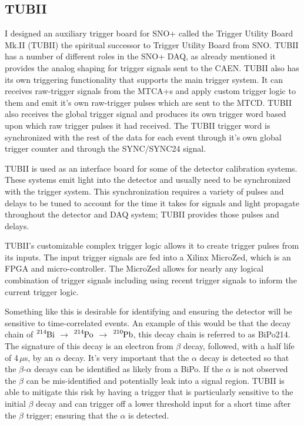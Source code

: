 \subsection{TUBII}
\label{sec:tubii}
I designed an auxiliary trigger board for SNO+ called the Trigger
Utility Board Mk.II (TUBII) the spiritual successor to Trigger Utility Board
from SNO\@. 
TUBII has a number of different roles in the SNO+ DAQ, as already mentioned it
provides the analog shaping for trigger signals sent to the CAEN\@.
TUBII also has its own triggering functionality that supports the main
trigger system. It can receives raw-trigger signals from the MTCA+s and
apply custom trigger logic to them and emit it's own raw-trigger pulses which are
sent to the MTCD\@.
TUBII also receives the global trigger signal and produces its own trigger
word based upon which raw trigger pulses it had received. The TUBII trigger
word is synchronized with the rest of the data for each event through it's own
global trigger counter and through the SYNC/SYNC24 signal.

TUBII is used as an interface board for some of the detector calibration systems.
These systems emit light into the detector and usually need to be
synchronized with the trigger system. This synchronization requires
a variety of pulses and delays to be tuned to account for the time it
takes for signals and light propagate throughout the detector and DAQ
system; TUBII provides those pulses and delays.

TUBII's customizable complex trigger logic
allows it to create trigger pulses from its inputs.
The input trigger signals are fed into a Xilinx MicroZed, which is an FPGA and
micro-controller.
The MicroZed allows for nearly any logical combination of trigger signals including
using recent trigger signals to inform the current trigger logic.

Something like this is desirable for identifying and ensuring the detector will
be sensitive to time-correlated events. An example of this would be that
the decay chain of $\ce{^{214}Bi}$ $\rightarrow$ $\ce{^{214}Po}$ $\rightarrow$ $\ce{^{210}Pb}$,
this decay chain is referred to as BiPo214. %
The signature of this decay is an electron from $\beta$ decay, followed, with a half
life of 4\,$\mu$s, by an $\alpha$ decay.
It's very important that the $\alpha$ decay is detected so that the $\beta$-$\alpha$
decays can be identified as likely from a BiPo. If the $\alpha$ is not observed
the $\beta$ can be mis-identified and potentially leak into a signal region.
TUBII is able to mitigate this risk by having a trigger that is particularly
sensitive to the initial $\beta$ decay and can trigger off a lower
threshold input for a short time after the $\beta$ trigger; ensuring that
the $\alpha$ is detected.

